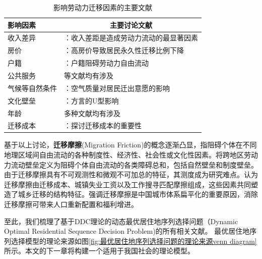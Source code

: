 \documentclass[a4paper, zihao=-4, fontset = mac, oneside]{ctexbook} %
\begin{document}
\begin{table}[!ht]
\centering
\caption{影响劳动力迁移因素的主要文献}
\begin{tabularx}{\textwidth}{@{}lX@{}}
\toprule
\textbf{影响因素} & \multicolumn{1}{c}{\textbf{主要讨论文献}} \\ 
\midrule
收入差异  &  \textcite{kennanEffectExpectedIncome2011}：收入差距是造成劳动力流动的最显著因素\\
房价   &  \textcite{ZhangLiFangJieRuHeYingXiangLaoDongLiLiuDong2017}：高房价导致居民永久性迁移比例下降\\
户籍   & \textcite{ngaiChinasMobilityBarriers2019}：户籍阻碍劳动力自由流动\\
公共服务 &    \textcite{XiaYiRanChengShiJianDeMengMuSanQianGongGongFuWuYingXiangLaoDongLiLiuXiangDeJingYanYanJiu2015}等文献均有涉及\\
气候等自然条件  &  \textcite{HongDaYongDiWeiChaiYiGuaYingXingYuJiXiaoQiDaiKongQiWuRanYouZhiDeJuMinQianChuYiXiangFenYiYanJiu2016}：空气质量对居民迁出意愿的影响\\
文化壁垒 &   \textcite{LiuYuYunLaoDongLiKuaFangYanLiuDongDeDaoUXingMoShi2015}：方言的U型影响\\
年龄 &  多种文献均有涉及\\
迁移成本 &  \textcite{todaroModelLaborMigration1969}：探讨迁移成本的重要性\\
\bottomrule
\end{tabularx}
\label{tab:影响劳动力迁移的因素}
\end{table}

基于以上讨论，\textbf{迁移摩擦}(Migration Friction)的概念逐渐凸显，指阻碍个体在不同地理区域间自由流动的各种制度性、经济性、社会性或文化性因素。\textcite{JiangWeiZhongGuoKuaDiQuLaoDongLiLiuDongBiLeiCeDuFangFaYanJinQuShiYuJueDingYinSu2024}将跨地区劳动力流动壁垒定义为阻碍个体自由流动的各类障碍总和，包括自然壁垒和制度壁垒。由于迁移摩擦具有不可观测性和微观不可加总的特征，其测度成为研究难点。\textcite{WangLiLiWoGuoRenKouQianYiChengBenChengShiGuiMoYuShengChanLu2020}认为迁移摩擦由迁移成本、城镇失业工资以及工作搜寻匹配摩擦组成，这些因素共同塑造了城乡迁移的结构特征。\textcite{LiuXiuYanFangJieQianYiMoCaYuZhongGuoChengShiDeGuiMoFenBuLiLunMoXingYuJieGouShiGuJi2017}强调迁移摩擦是中国城市体系扁平化的重要原因，消除迁移摩擦可带来人口重新配置和福利增进。

至此，我们梳理了基于DDC理论的动态最优居住地序列选择问题（Dynamic Optimal Residential Sequence Decision Problem)的所有相关文献。
最优居住地序列选择模型的理论来源如图\ref{fig:最优居住地序列选择问题的理论来源venn diagram}所示。本文的下一章将构建一个适用于我国社会的理论模型。
\end{document}
